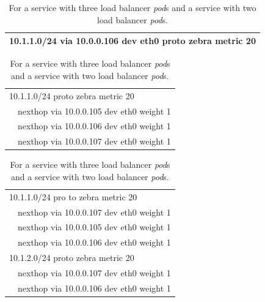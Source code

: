 {
\setlength{\tabcolsep}{1em}
\renewcommand{\arraystretch}{1.2}

\begin{table}[h]

  \begin{subtable}{.9\textwidth}
    \centering
    \begin{tabular}{l}
    \hline 
    10.1.1.0/24 via 10.0.0.106 dev eth0 proto zebra metric 20 \\
    \hline
    \end{tabular}
    \caption{With single load balancer {\em pod}.}
    \label{tab:single}
  \end{subtable}

  \par\bigskip

  \begin{subtable}{.9\textwidth}
    \centering
    \begin{tabular}{ll}
      \hline
      \multicolumn{2}{l}{10.1.1.0/24 proto zebra metric 20 } \\
      \hspace{15 mm}
      & nexthop via 10.0.0.105  dev eth0 weight 1 \\
      & nexthop via 10.0.0.106  dev eth0 weight 1 \\
      & nexthop via 10.0.0.107  dev eth0 weight 1 \\
      \hline
    \end{tabular}
    \caption{With three load balancer {\em pod}s.}
    \label{tab:three}
  \end{subtable}
  
  \par\bigskip
  
  \begin{subtable}{.9\textwidth}
    \centering
    \begin{tabular}{ll}
      \hline
      \multicolumn{2}{l}{10.1.1.0/24 pro to zebra metric 20 } \\
      \hspace{15 mm}
      & nexthop via 10.0.0.107  dev eth0 weight 1 \\
      & nexthop via 10.0.0.105  dev eth0 weight 1 \\
      & nexthop via 10.0.0.106  dev eth0 weight 1 \\
      \multicolumn{2}{l}{10.1.2.0/24 proto zebra metric 20 } \\
      \hspace{15 mm}
      & nexthop via 10.0.0.107  dev eth0 weight 1 \\
      & nexthop via 10.0.0.106  dev eth0 weight 1 \\
      \hline
    \end{tabular}
    \caption{For a service with three load balancer {\em pod}s and a service with two load balancer {\em pod}s.}
    \label{tab:double_svc}
  \end{subtable}
  

\end{table}}
